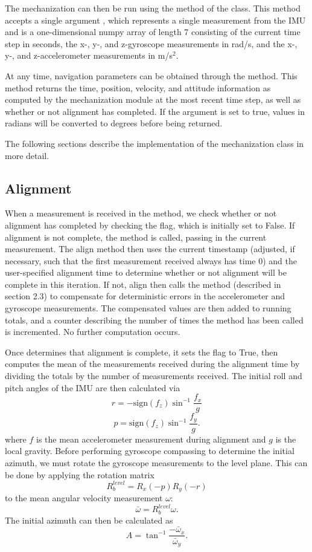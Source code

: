 \documentclass[11pt, oneside]{article}   	%
\begin{document}
The mechanization can then be run using the  method of the  class.  This method accepts a single argument , which represents a single measurement from the IMU and is a one-dimensional numpy array of length 7 consisting of the current time step in seconds, the x-, y-, and z-gyroscope measurements in rad/s, and the x-, y-, and z-accelerometer measurements in m/s$^2$.  

At any time, navigation parameters can be obtained through the  method.  This method returns the time, position, velocity, and attitude information as computed by the mechanization module at the most recent time step, as well as whether or not alignment has completed.  If the argument  is set to true, values in radians will be converted to degrees before being returned.

The following sections describe the implementation of the mechanization class in more detail.

\subsection{Alignment}
When a measurement is received in the  method, we check whether or not alignment has completed by checking the  flag, which is initially set to False.  If alignment is not complete, the  method is called, passing in the current measurement.  The align method then uses the current timestamp (adjusted, if necessary, such that the first measurement received always has time 0) and the user-specified alignment time to determine whether or not alignment will be complete in this iteration.  If not, align then calls the  method (described in section 2.3) to compensate for deterministic errors in the accelerometer and gyroscope measurements.  The compensated values are then added to running totals, and a counter describing the number of times the  method has been called is incremented.  No further computation occurs.

Once  determines that alignment is complete, it sets the  flag to True, then computes the mean of the measurements received during the alignment time by dividing the totals by the number of measurements received.  The initial roll and pitch angles of the IMU are then calculated via
$$r=-\textrm{sign}(f_z)\sin^{-1}\frac{f_x}{g}$$
$$p=\textrm{sign}(f_z)\sin^{-1}\frac{f_y}{g}.$$
where $f$ is the mean accelerometer measurement during alignment and $g$ is the local gravity.  Before performing gyroscope compassing to determine the initial azimuth, we must rotate the gyroscope measurements to the level plane.  This can be done by applying the rotation matrix
$$R_b^{level}=R_x(-p)R_y(-r)$$
to the mean angular velocity measurement $\omega$:
$$\bar \omega=R_b^{level}\omega.$$
The initial azimuth can then be calculated as 
$$A=\tan^{-1}\frac{-\bar\omega_x}{\bar\omega_y}.$$
\end{document}
